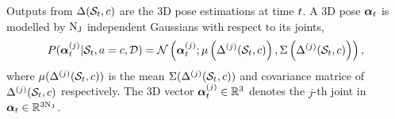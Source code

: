 Outputs from $\Delta(\mathcal{S}_{t}, c)$ are the 3D pose estimations at time $t$. A 3D pose $\boldsymbol{\alpha}_{t}$ is modelled by $\mathrm{N_{J}}$ independent Gaussians with respect to its joints,  
\begin{equation} 
	\label{eqn/body/adgaussian}
	P( \boldsymbol{\alpha}^{(j)}_{t}| \mathcal{S}_{t}, a = c,\mathcal{D}) =
	\mathcal{N}\left(\boldsymbol{\alpha}^{(j)}_{t}; \mu\left(\Delta^{(j)}(\mathcal{S}_{t},c)\right), \Sigma\left(\Delta^{(j)}(\mathcal{S}_{t},c)\right)\right),
\end{equation}
where $\mu(\Delta^{(j)}(\mathcal{S}_{t},c))$ is the mean $\Sigma(\Delta^{(j)}(\mathcal{S}_{t},c))$ and covariance matrice of $\Delta^{(j)}(\mathcal{S}_{t},c)$ respectively.  The 3D vector $\boldsymbol{\alpha}_{t}^{(j)}\in\mathbb{R}^{3}$ denotes the $j$-th joint in $\boldsymbol{\alpha}_{t}\in\mathbb{R}^{3\mathrm{N_{J}}}$.


